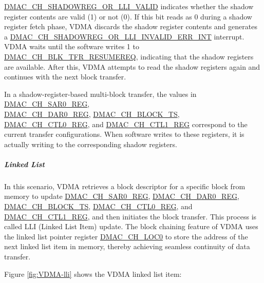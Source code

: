 \documentclass[main\_\_EN.tex]{subfiles}
\begin{document}
\hyperref[fielddesc:DMACCHNSHADOWREGORLLIVALID]{DMAC\_CH\_SHADOWREG\_OR\_LLI\_VALID} indicates whether the shadow register contents are valid (1) or not (0). If this bit reads as 0 during a shadow register fetch phase, VDMA discards the shadow register contents and generates a \hyperref[int:DMACCHNSHADOWREGORLLIINVALIDERRINT]{DMAC\_CH\_SHADOWREG\_OR\_LLI\_INVALID\_ERR\_INT} interrupt. VDMA waits until the software writes 1 to \hyperref[fielddesc:DMACCHNBLKTFRRESUMEREQ]{DMAC\_CH\_BLK\_TFR\_RESUMEREQ}, indicating that the shadow registers are available. After this, VDMA attempts to read the shadow registers again and continues with the next block transfer.

\begin{tiplisting}
    In a shadow-register-based multi-block transfer, the values in \hyperref[regdesc:DMACCHNSAR0REG]{DMAC\_CH\_SAR0\_REG}, \\\hyperref[regdesc:DMACCHNDAR0REG]{DMAC\_CH\_DAR0\_REG}, \hyperref[fielddesc:DMACCHNBLOCKTS]{DMAC\_CH\_BLOCK\_TS}, \hyperref[regdesc:DMACCHNCTL0REG]{DMAC\_CH\_CTL0\_REG}, and \hyperref[regdesc:DMACCHNCTL1REG]{DMAC\_CH\_CTL1\_REG} correspond to the current transfer configurations. When software writes to these registers, it is actually writing to the corresponding shadow registers.
\end{tiplisting}

\subparagraph{Linked List}

In this scenario, VDMA retrieves a block descriptor for a specific block from memory to update \hyperref[regdesc:DMACCHNSAR0REG]{DMAC\_CH\_SAR0\_REG}, \hyperref[regdesc:DMACCHNDAR0REG]{DMAC\_CH\_DAR0\_REG}, \hyperref[fielddesc:DMACCHNBLOCKTS]{DMAC\_CH\_BLOCK\_TS}, \hyperref[regdesc:DMACCHNCTL0REG]{DMAC\_CH\_CTL0\_REG}, and \hyperref[regdesc:DMACCHNCTL1REG]{DMAC\_CH\_CTL1\_REG}, and then initiates the block transfer. This process is called LLI (Linked List Item) update. The block chaining feature of VDMA uses the linked list pointer register \hyperref[fielddesc:DMACCHNLOC0]{DMAC\_CH\_LOC0} to store the address of the next linked list item in memory, thereby achieving seamless continuity of data transfer.

Figure \ref{fig:VDMA-lli} shows the VDMA linked list item:
\end{document}
